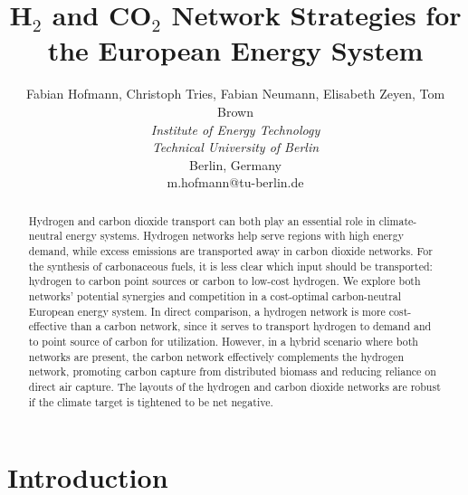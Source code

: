 \documentclass[twocolumn]{article}
\newcommand{\carbon}{CO$_2$}
\newcommand{\hydrogen}{H$_2$}
\begin{document}

\title{\hydrogen{} and \carbon{} Network Strategies for the European Energy System}



\author{
    Fabian Hofmann, Christoph Tries, Fabian Neumann, Elisabeth Zeyen, Tom Brown \\
    \textit{Institute of Energy Technology} \\
    \textit{Technical University of Berlin}\\
    Berlin, Germany \\
    m.hofmann@tu-berlin.de
}


\maketitle

\begin{abstract}
    Hydrogen and carbon dioxide transport can both play an essential role in climate-neutral energy systems. Hydrogen networks help serve regions with high energy demand, while excess emissions are transported away in carbon dioxide networks. For the synthesis of carbonaceous fuels, it is less clear which input should be transported: hydrogen to carbon point sources or carbon to low-cost hydrogen. We explore both networks' potential synergies and competition in a cost-optimal carbon-neutral European energy system. In direct comparison, a hydrogen network is more cost-effective than a carbon network, since it serves to transport hydrogen to demand and to point source of carbon for utilization. However, in a hybrid scenario where both networks are present, the carbon network effectively complements the hydrogen network, promoting carbon capture from distributed biomass and reducing reliance on direct air capture. The layouts of the hydrogen and carbon dioxide networks are robust if the climate target is tightened to be net negative.
\end{abstract}


\section{Introduction}
\end{document}
